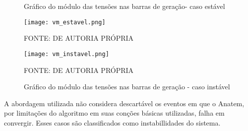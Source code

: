 \documentclass[12pt,oneside,a4paper,chapter=TITLE,section=TITLE,sumario=tradicional,english,brazil]{abntex2}
\begin{document}
 \begin{figure}[h]
\centering
 \caption{Gráfico do módulo das tensões nas barras de geração- caso estável}
 \texttt{[image: vm\_estavel.png]}
  \par 
 FONTE: DE AUTORIA PRÓPRIA
 \par 
\caption{Gráfico do módulo das tensões nas barras de geração - caso instável}
 \texttt{[image: vm\_instavel.png]}
  \par 
 FONTE: DE AUTORIA PRÓPRIA
 \par 
\end{figure}
\par 
A abordagem utilizada não considera descartável os eventos em que o Anatem, por limitações do algoritmo em suas conções básicas utilizadas, falha em convergir. Esses casos são classificados como instabillidades do sistema. 
\end{document}
